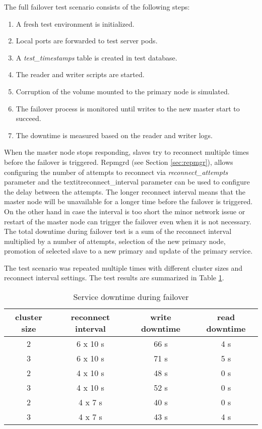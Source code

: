 \documentclass[
  digital, %
  twoside, %
  table,   %
  lof,     %
  lot,     %
]{fithesis3}
\begin{document}
The full failover test scenario consists of the following steps:
\begin{enumerate}
  \item  A fresh test environment is initialized. 
  \item Local ports are forwarded to test server pods.
  \item A \textit{test\_timestamps} table is created in test database.
  \item The reader and writer scripts are started.
  \item Corruption of the volume mounted to the primary node is simulated.
  \item The failover process is monitored until writes to the new master start to succeed.
  \item The downtime is measured based on the reader and writer logs.
\end{enumerate}

When the master node stops responding, slaves try to reconnect multiple times before the failover is triggered. Repmgrd (see Section \ref{sec:repmgr}), allows configuring the number of attempts to reconnect via \textit{reconnect\_attempts} parameter and the textit{reconnect\_interval} parameter can be used to configure the delay between the attempts. The longer reconnect interval means that the master node will be unavailable for a longer time before the failover is triggered. On the other hand in case the interval is too short the minor network issue or restart of the master node can trigger the failover even when it is not necessary. The total downtime during failover test is a sum of the reconnect interval multiplied by a number of attempts, selection of the new primary node, promotion of selected slave to a new primary and update of the primary service.

The test scenario was repeated multiple times with different cluster sizes and reconnect interval settings. The test results are summarized in Table \ref{table:failover_testing}.

\begin{table}[ht!]
\centering
\begin{tabular}{|c c c c|}
 \hline
 cluster size & reconnect interval & write downtime & read downtime \\ [0.5ex]
 \hline
 2 & 6 x 10 s & 66 s & 4 s \\
 3 & 6 x 10 s & 71 s & 5 s \\
 2 & 4 x 10 s & 48 s & 0 s \\
 3 & 4 x 10 s & 52 s & 0 s \\
 2 & 4 x 7 s  & 40 s & 0 s  \\
 3 & 4 x 7 s  & 43 s & 4 s  \\ [1ex]
 \hline
\end{tabular}
\caption{Service downtime during failover}
\label{table:failover_testing}
\end{table}
\end{document}
